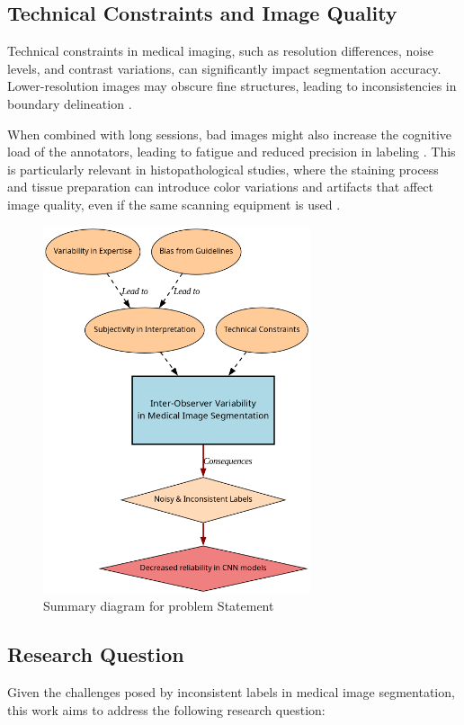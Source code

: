 \subsection{Technical Constraints and Image
Quality}\label{subsec:technical_constraints}

Technical constraints in medical imaging, such as resolution
differences, noise levels, and contrast variations, can significantly
impact segmentation accuracy. Lower-resolution images may obscure
fine structures, leading to inconsistencies in boundary delineation
\cite{ZhouEtAl2024}.

When combined with long sessions, bad images might
also increase the cognitive load of the annotators, leading to
fatigue and reduced precision in labeling \cite{KimYujinAndLee2024}.
This is particularly relevant in histopathological studies, where the
staining process and tissue preparation can introduce color
variations and artifacts that affect image quality, even if the same scanning
equipment is used \cite{Karthikeyan2023}.

\begin{figure}
  \centering
  \includegraphics[width=0.7\textwidth]{Cap1/Figures/problem_statement_diagram.png}
  \caption{Summary diagram for problem Statement}
  \label{fig:problem_statement_diagram}
\end{figure}

\subsection{Research Question}

Given the challenges posed by inconsistent labels in medical image
segmentation, this work aims to address the following research
question:


